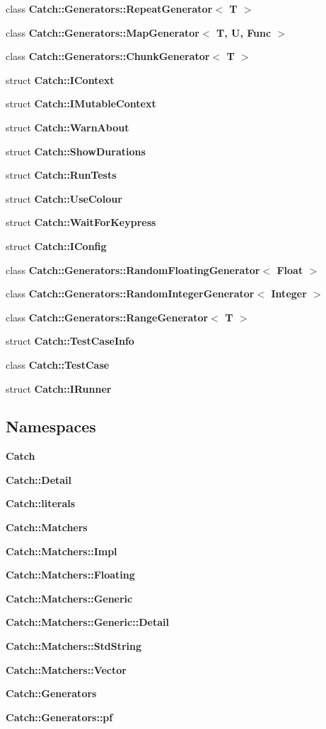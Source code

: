 \begin{DoxyCompactItemize}
\item 
class \textbf{ Catch\+::\+Generators\+::\+Repeat\+Generator$<$ T $>$}
\item 
class \textbf{ Catch\+::\+Generators\+::\+Map\+Generator$<$ T, U, Func $>$}
\item 
class \textbf{ Catch\+::\+Generators\+::\+Chunk\+Generator$<$ T $>$}
\item 
struct \textbf{ Catch\+::\+I\+Context}
\item 
struct \textbf{ Catch\+::\+I\+Mutable\+Context}
\item 
struct \textbf{ Catch\+::\+Warn\+About}
\item 
struct \textbf{ Catch\+::\+Show\+Durations}
\item 
struct \textbf{ Catch\+::\+Run\+Tests}
\item 
struct \textbf{ Catch\+::\+Use\+Colour}
\item 
struct \textbf{ Catch\+::\+Wait\+For\+Keypress}
\item 
struct \textbf{ Catch\+::\+I\+Config}
\item 
class \textbf{ Catch\+::\+Generators\+::\+Random\+Floating\+Generator$<$ Float $>$}
\item 
class \textbf{ Catch\+::\+Generators\+::\+Random\+Integer\+Generator$<$ Integer $>$}
\item 
class \textbf{ Catch\+::\+Generators\+::\+Range\+Generator$<$ T $>$}
\item 
struct \textbf{ Catch\+::\+Test\+Case\+Info}
\item 
class \textbf{ Catch\+::\+Test\+Case}
\item 
struct \textbf{ Catch\+::\+I\+Runner}
\end{DoxyCompactItemize}
\subsection*{Namespaces}
\begin{DoxyCompactItemize}
\item 
 \textbf{ Catch}
\item 
 \textbf{ Catch\+::\+Detail}
\item 
 \textbf{ Catch\+::literals}
\item 
 \textbf{ Catch\+::\+Matchers}
\item 
 \textbf{ Catch\+::\+Matchers\+::\+Impl}
\item 
 \textbf{ Catch\+::\+Matchers\+::\+Floating}
\item 
 \textbf{ Catch\+::\+Matchers\+::\+Generic}
\item 
 \textbf{ Catch\+::\+Matchers\+::\+Generic\+::\+Detail}
\item 
 \textbf{ Catch\+::\+Matchers\+::\+Std\+String}
\item 
 \textbf{ Catch\+::\+Matchers\+::\+Vector}
\item 
 \textbf{ Catch\+::\+Generators}
\item 
 \textbf{ Catch\+::\+Generators\+::pf}
\end{DoxyCompactItemize}
